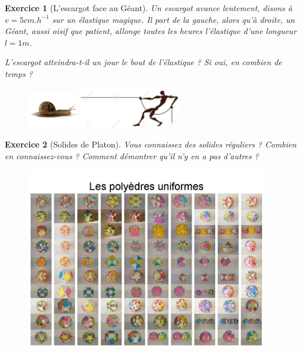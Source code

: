 \documentclass[12pt]{article}
\theoremstyle{break}
\newtheorem{exo}{Exercice}
\begin{document}
\begin{exo}[L'escargot face au Géant]
Un escargot avance lentement, disons à $v = 5 cm.h^{-1}$ sur un élastique magique. Il part de la gauche, alors qu'à droite, un Géant, aussi oisif que patient, allonge toutes les heures l'élastique d'une longueur $l = 1 m$.

L'escargot atteindra-t-il un jour le bout de l'élastique ? Si oui, en combien de temps ?
\begin{figure}[!ht]
	\centering
    \includegraphics[width=0.2\textwidth]{Escargot.jpg}
    \includegraphics[width=0.4\textwidth]{Geant.jpg}

\end{figure}
\end{exo}


\begin{exo}[Solides de Platon]
Vous connaissez des solides réguliers ? Combien en connaissez-vous ? Comment démontrer qu'il n'y en a pas d'autres ?

\begin{figure}[!ht]
	\centering
    \includegraphics[width=0.95\textwidth]{PolyedreUniforme.jpg}

\end{figure}
\end{exo}
\end{document}

